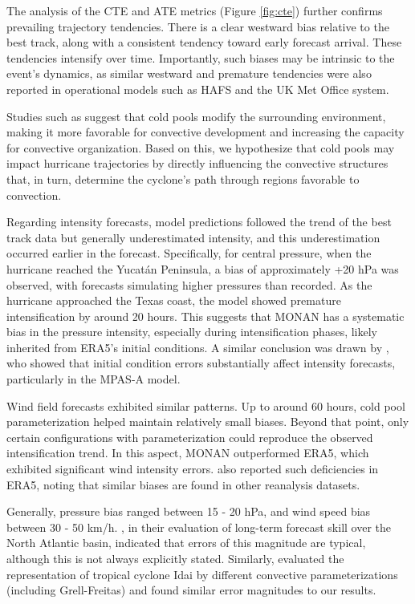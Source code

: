 The analysis of the CTE and ATE metrics (Figure \ref{fig:cte}) further confirms prevailing trajectory tendencies. There is a clear westward bias relative to the best track, along with a consistent tendency toward early forecast arrival. These tendencies intensify over time. Importantly, such biases may be intrinsic to the event’s dynamics, as similar westward and premature tendencies were also reported in operational models such as HAFS and the UK Met Office system.

Studies such as  suggest that cold pools modify the surrounding environment, making it more favorable for convective development and increasing the capacity for convective organization. Based on this, we hypothesize that cold pools may impact hurricane trajectories by directly influencing the convective structures that, in turn, determine the cyclone’s path through regions favorable to convection.

Regarding intensity forecasts, model predictions followed the trend of the best track data but generally underestimated intensity, and this underestimation occurred earlier in the forecast. Specifically, for central pressure, when the hurricane reached the Yucatán Peninsula, a bias of approximately +20 hPa was observed, with forecasts simulating higher pressures than recorded. As the hurricane approached the Texas coast, the model showed premature intensification by around 20 hours. This suggests that MONAN has a systematic bias in the pressure intensity, especially during intensification phases, likely inherited from ERA5’s initial conditions. A similar conclusion was drawn by , who showed that initial condition errors substantially affect intensity forecasts, particularly in the MPAS-A model.

Wind field forecasts exhibited similar patterns. Up to around 60 hours, cold pool parameterization helped maintain relatively small biases. Beyond that point, only certain configurations with parameterization could reproduce the observed intensification trend. In this aspect, MONAN outperformed ERA5, which exhibited significant wind intensity errors.  also reported such deficiencies in ERA5, noting that similar biases are found in other reanalysis datasets.

Generally, pressure bias ranged between 15 - 20 hPa, and wind speed bias between 30 - 50 km/h. , in their evaluation of long-term forecast skill over the North Atlantic basin, indicated that errors of this magnitude are typical, although this is not always explicitly stated. Similarly,  evaluated the representation of tropical cyclone Idai by different convective parameterizations (including Grell-Freitas) and found similar error magnitudes to our results.

